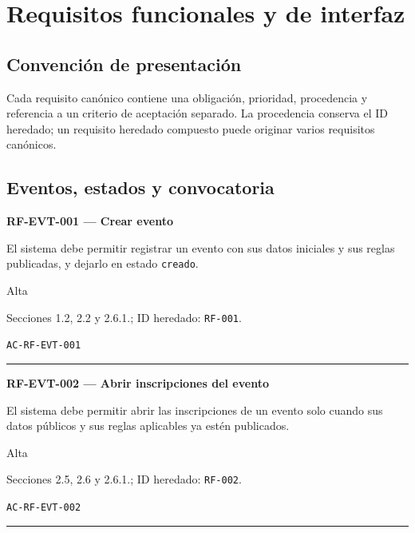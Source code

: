 \documentclass[10pt,letterpaper]{article}
\begin{document}
\section{Requisitos funcionales y de interfaz}
\subsection{Convención de presentación}
Cada requisito canónico contiene una obligación, prioridad, procedencia y referencia a un criterio de aceptación separado. La procedencia conserva el ID heredado; un requisito heredado compuesto puede originar varios requisitos canónicos.

\subsection{Eventos, estados y convocatoria}
\noindent\textbf{RF-EVT-001 --- Crear evento}\par
\begin{description}[style=nextline,leftmargin=3.15cm,labelwidth=2.8cm,font=\normalfont\bfseries]
\item[Obligación] El sistema debe permitir registrar un evento con sus datos iniciales y sus reglas publicadas, y dejarlo en estado \texttt{creado}.
\item[Prioridad] Alta
\item[Procedencia] Secciones 1.2, 2.2 y 2.6.1.; ID heredado: \texttt{RF-001}.
\item[Verificación] \texttt{AC-RF-EVT-001}
\end{description}
\vspace{0.25em}\hrule\vspace{0.65em}
\noindent\textbf{RF-EVT-002 --- Abrir inscripciones del evento}\par
\begin{description}[style=nextline,leftmargin=3.15cm,labelwidth=2.8cm,font=\normalfont\bfseries]
\item[Obligación] El sistema debe permitir abrir las inscripciones de un evento solo cuando sus datos públicos y sus reglas aplicables ya estén publicados.
\item[Prioridad] Alta
\item[Procedencia] Secciones 2.5, 2.6 y 2.6.1.; ID heredado: \texttt{RF-002}.
\item[Verificación] \texttt{AC-RF-EVT-002}
\end{description}
\vspace{0.25em}\hrule\vspace{0.65em}
\end{document}
